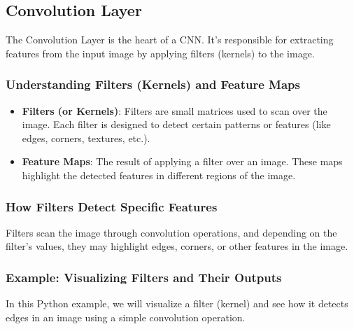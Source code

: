 \documentclass[
  letterpaper,
  DIV=11,
  numbers=noendperiod]{scrreprt}
\providecommand{\tightlist}{%
  \setlength{\itemsep}{0pt}\setlength{\parskip}{0pt}}\usepackage{longtable,booktabs,array}
\begin{document}
\subsection{Convolution Layer}\label{convolution-layer}

The Convolution Layer is the heart of a CNN. It's responsible for
extracting features from the input image by applying filters (kernels)
to the image.

\subsubsection{Understanding Filters (Kernels) and Feature
Maps}\label{understanding-filters-kernels-and-feature-maps}

\begin{itemize}
\tightlist
\item
  \textbf{Filters (or Kernels)}: Filters are small matrices used to scan
  over the image. Each filter is designed to detect certain patterns or
  features (like edges, corners, textures, etc.).
\item
  \textbf{Feature Maps}: The result of applying a filter over an image.
  These maps highlight the detected features in different regions of the
  image.
\end{itemize}

\subsubsection{How Filters Detect Specific
Features}\label{how-filters-detect-specific-features}

Filters scan the image through convolution operations, and depending on
the filter's values, they may highlight edges, corners, or other
features in the image.

\subsubsection{Example: Visualizing Filters and Their
Outputs}\label{example-visualizing-filters-and-their-outputs}

In this Python example, we will visualize a filter (kernel) and see how
it detects edges in an image using a simple convolution operation.
\end{document}
